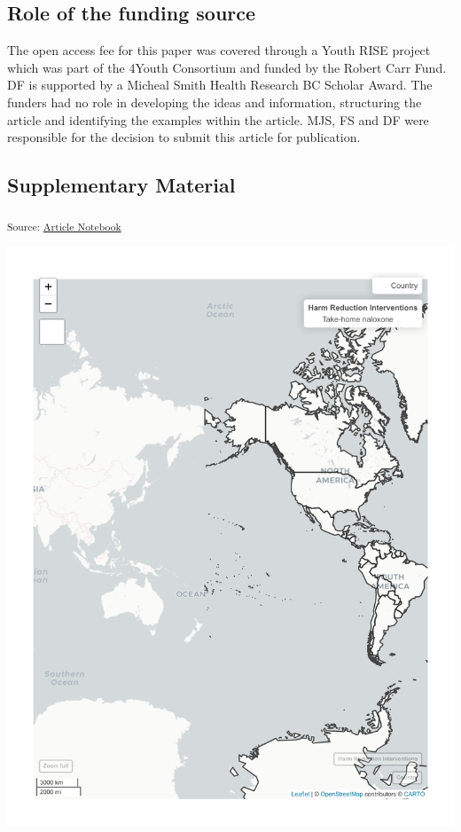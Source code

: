 \documentclass[
  letterpaper,
  DIV=11,
  numbers=noendperiod]{scrartcl}
\begin{document}
\subsection{Role of the funding
source}\label{role-of-the-funding-source}

The open access fee for this paper was covered through a Youth RISE
project which was part of the 4Youth Consortium and funded by the Robert
Carr Fund. DF is supported by a Micheal Smith Health Research BC Scholar
Award. The funders had no role in developing the ideas and information,
structuring the article and identifying the examples within the article.
MJS, FS and DF were responsible for the decision to submit this article
for publication.

\subsection{Supplementary Material}\label{sec-supp-material}

\textsubscript{Source:
\href{https://mx-jx.github.io/YPWUD/index-preview.html}{Article
Notebook}}

\includegraphics{index_files/figure-pdf/unnamed-chunk-2-1.pdf}
\end{document}
